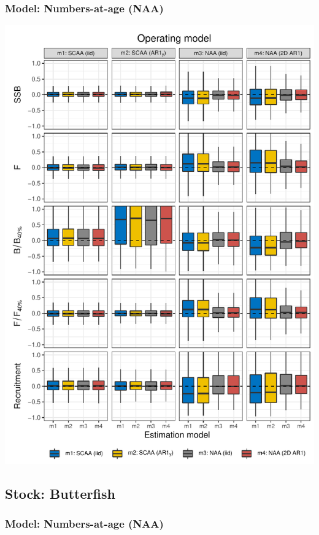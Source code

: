 \documentclass[]{article}
\begin{document}
\hypertarget{model-numbers-at-age-naa}{%
\subsubsection{Model: Numbers-at-age
(NAA)}\label{model-numbers-at-age-naa}}

\includegraphics[width=6in]{wham-sim-paper_files/figure-latex/unnamed-chunk-3-1}

\pagebreak

\pagebreak

\hypertarget{stock-butterfish}{%
\subsection{Stock: Butterfish}\label{stock-butterfish}}

\hypertarget{model-numbers-at-age-naa-1}{%
\subsubsection{Model: Numbers-at-age
(NAA)}\label{model-numbers-at-age-naa-1}}
\end{document}
